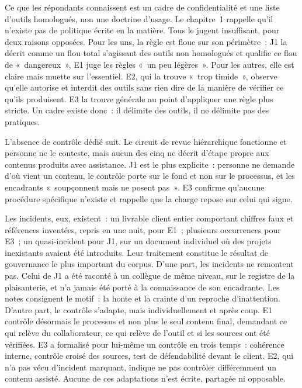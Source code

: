 Ce que les répondants connaissent est un cadre de confidentialité et une liste d'outils
homologués, non une doctrine d'usage. Le chapitre~1 rappelle qu'il n'existe pas de politique
écrite en la matière. Tous le jugent insuffisant, pour deux raisons opposées. Pour les uns,
la règle est floue sur son périmètre~: J1 la décrit comme un flou total s'agissant des
outils non homologués et qualifie ce flou de «~dangereux~», E1 juge les règles
«~un peu légères~». Pour les autres, elle est claire mais muette sur l'essentiel. E2, qui la
trouve «~trop timide~», observe qu'elle autorise et interdit des outils sans rien dire de la
manière de vérifier ce qu'ils produisent. E3 la trouve générale au point d'appliquer une
règle plus stricte. Un cadre
existe donc~: il délimite des outils, il ne délimite pas des pratiques.

L'absence de contrôle dédié suit. Le circuit de revue hiérarchique fonctionne et personne ne
le conteste, mais aucun des cinq ne décrit d'étape propre aux contenus produits avec
assistance. J1 est le plus explicite~: personne ne demande d'où vient un contenu, le contrôle
porte sur le fond et non sur le processus, et les encadrants «~soupçonnent mais ne posent
pas~». E3 confirme qu'aucune procédure spécifique n'existe et rappelle que la charge repose
sur celui qui signe.

Les incidents, eux, existent~: un livrable client entier comportant chiffres faux et
références inventées, repris en une nuit, pour E1~; plusieurs occurrences pour E3~; un
quasi-incident pour J1, sur un document individuel où des projets inexistants avaient été
introduits. Leur traitement constitue le résultat de gouvernance le plus important du corpus.
D'une part, les incidents ne remontent pas. Celui de J1 a été raconté à un collègue de même
niveau, sur le registre de la plaisanterie, et n'a jamais été porté à la connaissance de son
encadrante. Les notes consignent le motif~: la honte et la crainte d'un reproche
d'inattention. D'autre part, le contrôle s'adapte, mais individuellement et après coup. E1
contrôle désormais le processus et non plus le seul contenu final, demandant ce qui relève du
collaborateur, ce qui relève de l'outil et si les sources ont été vérifiées. E3 a formalisé
pour lui-même un contrôle en trois temps~: cohérence interne, contrôle croisé des sources,
test de défendabilité devant le client. E2, qui n'a pas vécu d'incident marquant, indique ne
pas contrôler différemment un contenu assisté. Aucune de ces adaptations n'est écrite,
partagée ni opposable.

